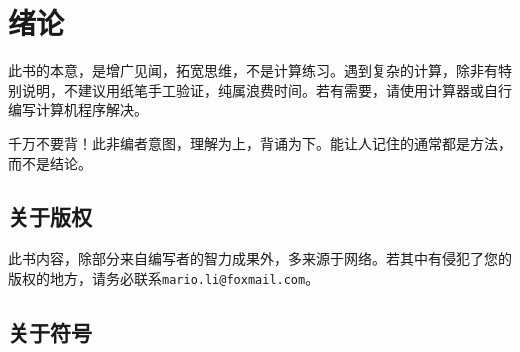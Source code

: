 
\chapter{绪论}
\label{chap:introduction}

此书的本意，是增广见闻，拓宽思维，不是计算练习。遇到复杂的计算，除非有特别说明，不建议用纸笔手工验证，纯属浪费时间。若有需要，请使用计算器或自行编写计算机程序解决。

千万不要背！此非编者意图，理解为上，背诵为下。能让人记住的通常都是方法，而不是结论。

\section{关于版权}
\label{sec:copyright}

此书内容，除部分来自编写者的智力成果外，多来源于网络。若其中有侵犯了您的版权的地方，请务必联系\verb|mario.li@foxmail.com|。

\section{关于符号}
\label{sec:symbol}


